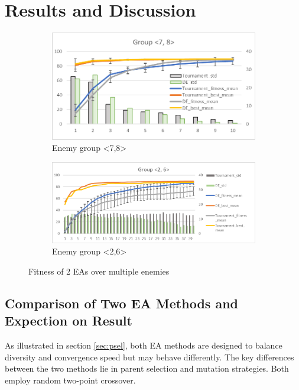 \section{Results and Discussion}
\begin{figure}[htbp]
    \centering
    \begin{subfigure}[htbp]{0.41\textwidth}
        \centering
        \includegraphics[width=\textwidth]{fig/g78_2.png}
        \caption{Enemy group <7,8>}
        \label{fig:gain_1}
    \end{subfigure}
    \hfill
    \begin{subfigure}[htbp]{0.55\textwidth}
        \centering
        \includegraphics[width=\textwidth]{fig/g26_2.png}
        \caption{Enemy group <2,6>}
        \label{fig:gain_2}
    \end{subfigure}
    \caption {Fitness of 2 EAs over multiple enemies}
    \label{fig:gain}
\end{figure}

\subsection{Comparison of Two EA Methods and Expection on Result}
As illustrated in section \ref{sec:psel}, both EA methods are designed to balance diversity and convergence speed but may behave differently. The key differences between the two methods lie in parent selection and mutation strategies. Both employ random two-point crossover.

